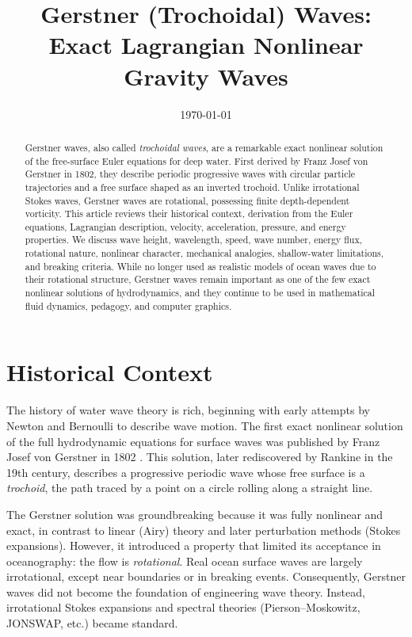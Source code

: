 \documentclass[11pt,letterpaper]{article}
\title{Gerstner (Trochoidal) Waves: \\
Exact Lagrangian Nonlinear Gravity Waves}
\author{}
\date{\today}
\begin{document}
\maketitle

\begin{abstract}
Gerstner waves, also called \emph{trochoidal waves}, are a remarkable exact nonlinear solution of the free-surface Euler equations for deep water. First derived by Franz Josef von Gerstner in 1802, they describe periodic progressive waves with circular particle trajectories and a free surface shaped as an inverted trochoid. Unlike irrotational Stokes waves, Gerstner waves are rotational, possessing finite depth-dependent vorticity. This article reviews their historical context, derivation from the Euler equations, Lagrangian description, velocity, acceleration, pressure, and energy properties. We discuss wave height, wavelength, speed, wave number, energy flux, rotational nature, nonlinear character, mechanical analogies, shallow-water limitations, and breaking criteria. While no longer used as realistic models of ocean waves due to their rotational structure, Gerstner waves remain important as one of the few exact nonlinear solutions of hydrodynamics, and they continue to be used in mathematical fluid dynamics, pedagogy, and computer graphics.
\end{abstract}

\tableofcontents
\bigskip

\section{Historical Context}
The history of water wave theory is rich, beginning with early attempts by Newton and Bernoulli to describe wave motion. The first exact nonlinear solution of the full hydrodynamic equations for surface waves was published by Franz Josef von Gerstner in 1802 \cite{gerstner1802}. This solution, later rediscovered by Rankine in the 19th century, describes a progressive periodic wave whose free surface is a \emph{trochoid}, the path traced by a point on a circle rolling along a straight line.

The Gerstner solution was groundbreaking because it was fully nonlinear and exact, in contrast to linear (Airy) theory and later perturbation methods (Stokes expansions). However, it introduced a property that limited its acceptance in oceanography: the flow is \emph{rotational}. Real ocean surface waves are largely irrotational, except near boundaries or in breaking events. Consequently, Gerstner waves did not become the foundation of engineering wave theory. Instead, irrotational Stokes expansions and spectral theories (Pierson–Moskowitz, JONSWAP, etc.) became standard.
\end{document}

